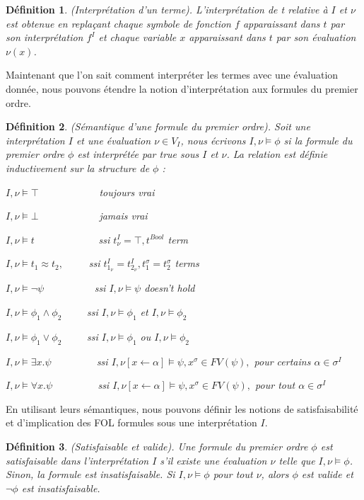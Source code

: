 \documentclass[9pt,openany]{book}
\newtheorem{definition}{D\'efinition}[section]
\begin{document}
\begin{definition}
(Interpr\'etation d'un terme). L'interpr\'etation de t relative \`a $I$ et $\nu$ est obtenue en repla\c{c}ant chaque symbole de fonction $f$ apparaissant dans $t$ par son interpr\'etation $f^{I}$ et chaque variable $x$ apparaissant dans $t$ par son \'evaluation $\nu(x)$.
\end{definition}
Maintenant que l'on sait comment interpr\'eter les termes avec une \'evaluation donn\'ee, nous pouvons \'etendre la notion d'interpr\'etation aux formules du premier ordre.
\begin{definition}
(S\'emantique d'une formule du premier ordre). Soit une interpr\'etation $I$ et une \'evaluation $\nu \in V_{I}$, nous \'ecrivons $I,\nu\models\phi$ si la formule du premier ordre $\phi$ est interpr\'et\'ee par true sous $I$ et $\nu$. La relation est d\'efinie inductivement sur la structure de $\phi$ :\par
$I,\nu\models\top$~~~~~~~~~~~~toujours vrai\par
$I,\nu\models\bot$~~~~~~~~~~~~jamais vrai\par
$I,\nu\models t$~~~~~~~~~~~~ ssi $t^{I}_{\nu}=\top,t^{Bool}$ term\par
$I,\nu\models t_{1}\approx t_{2},$~~~~~ssi $t^{I}_{1_{\nu}}=t^{I}_{2_{\nu}},t^{\sigma}_{1}=t^{\sigma}_{2}$ terms\par
$I,\nu\models\neg\psi$~~~~~~~~~~ssi $I,\nu\models\psi$ doesn't hold\par
$I,\nu\models\phi_{1}\land\phi_{2}$~~~~~ssi $I,\nu\models\phi_{1}$ et $I,\nu\models\phi_{2}$\par
$I,\nu\models\phi_{1}\lor\phi_{2}$~~~~~ssi $I,\nu\models\phi_{1}$ ou $I,\nu\models\phi_{2}$\par
$I,\nu\models\exists x.\psi$~~~~~~~~~ssi $I,\nu[x\leftarrow\alpha]\models\psi, x^{\sigma}\in FV(\psi),$ pour certains $\alpha\in\sigma^{I}$\par
$I,\nu\models\forall x.\psi$~~~~~~~~~ssi $I,\nu[x\leftarrow\alpha]\models\psi, x^{\sigma}\in FV(\psi),$ pour tout $\alpha\in\sigma^{I}$
\end{definition}

En utilisant leurs s\'emantiques, nous pouvons d\'efinir les notions de satisfaisabilit\'e  et d'implication des FOL formules sous une interpr\'etation $I$.

\begin{definition}
(Satisfaisable et valide). Une formule du premier ordre $\phi$ est satisfaisable dans l'interpr\'etation $I$ s'il existe une \'evaluation $\nu$ telle que $I,\nu\models\phi$. Sinon, la formule est insatisfaisable. Si $I,\nu\models\phi$ pour tout $\nu$, alors $\phi$ est valide et $\neg\phi$ est insatisfaisable.
\end{definition}
\end{document}
